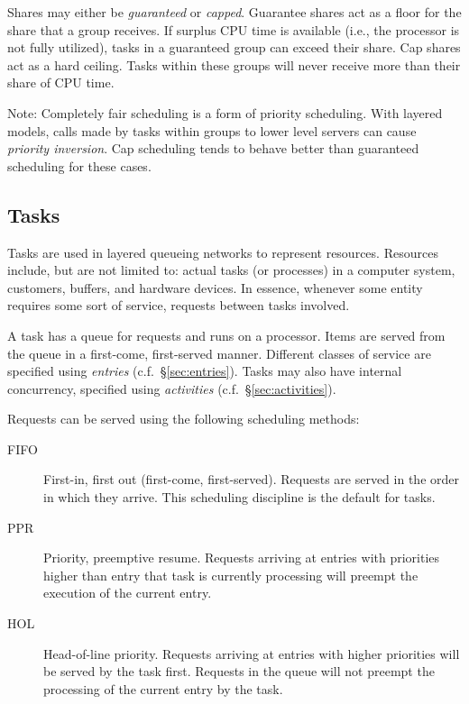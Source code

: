 Shares may either be \emph{guaranteed} or \emph{capped}.  Guarantee
shares act as a floor for the share that a group receives.  If surplus CPU time is available (i.e., the
processor is not fully utilized), tasks in a guaranteed group can exceed their share.
Cap shares act as a hard ceiling.  Tasks within these groups will never receive more than their share of CPU
time.  

Note: Completely fair scheduling is a form of priority scheduling.  With layered
models, calls made by tasks within groups to lower level servers can cause \emph{priority
  inversion}.  Cap scheduling tends to behave better than guaranteed scheduling
for these cases.

\subsection{Tasks}
\label{sec:tasks}

Tasks are used in layered queueing networks to
represent resources.  Resources include, but are not limited to:
actual tasks (or processes) in a computer system,
customers, buffers, and hardware
devices.  In essence, whenever some entity requires some sort of
service, requests between tasks involved.

A task has a queue for requests and runs on a
processor.  Items are served from the queue in a first-come,
first-served manner.  Different classes of
service are specified using
\emph{entries} (c.f.~\S\ref{sec:entries}).  Tasks may
also have internal concurrency, specified using
\emph{activities} (c.f.~\S\ref{sec:activities}).

Requests can be served using the following scheduling
methods:
\begin{description}
\item[FIFO] First-in, first out (first-come,
  first-served).  Requests are served in the order in which they
  arrive.  This scheduling discipline is the default for tasks.
\item[PPR] Priority, preemptive resume.  Requests arriving at entries with
  priorities higher than
  entry that task is currently processing will preempt the execution
  of the current entry.
\item[HOL] Head-of-line priority.
  Requests arriving at entries with higher priorities will be served
  by the task first.  Requests in the queue will not preempt the
  processing of the current entry by the task.
\end{description}

